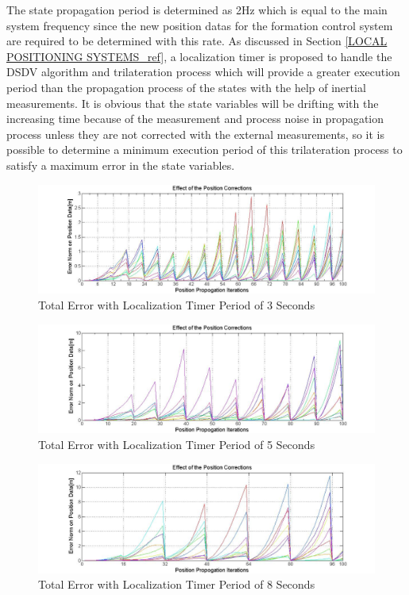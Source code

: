 The state propagation period is determined as 2Hz which is equal to the main system frequency since the new position datas for the formation control system are required to be determined with this rate. 	As discussed in Section \ref{LOCAL POSITIONING SYSTEMS_ref}, a localization timer is proposed to handle the DSDV algorithm and trilateration process which will provide a greater execution period than the propagation process of the states with the help of inertial measurements. It is obvious that the state variables will be drifting with the increasing time because of the measurement and process noise in propagation process unless they are not corrected with the external measurements, so it is possible to determine a minimum execution period of this trilateration process to satisfy a maximum error in the state variables. 
		
\begin{figure}[H]
\caption{Total Error with Localization Timer Period of 3 Seconds}
\centerline{\includegraphics[scale = 0.4]{Error-0,5Prop-3Update}}
\end{figure} 
		
\begin{figure}[H]
\caption{Total Error with Localization Timer Period of 5 Seconds}
\centerline{\includegraphics[scale = 0.4]{Error-0,5Prop-5Update}}
\end{figure} 

\begin{figure}[H]
\caption{Total Error with Localization Timer Period of 8 Seconds}
\centerline{\includegraphics[scale = 0.4]{Error-0,5Prop-8Update}}
\end{figure} 		
		
